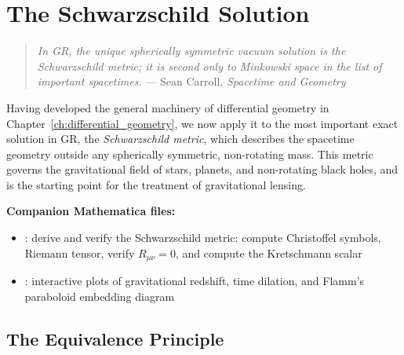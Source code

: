 
\chapter{The Schwarzschild Solution}
\label{ch:schwarzschild}

\begin{quote}
\textit{In GR, the unique spherically symmetric vacuum solution is the
Schwarzschild metric; it is second only to Minkowski space in the list of
important spacetimes.}
\hfill --- Sean Carroll, \textit{Spacetime and Geometry}
\end{quote}

\noindent
Having developed the general machinery of differential geometry in
Chapter~\ref{ch:differential_geometry}, we now apply it to the most important exact solution in GR,
the \emph{Schwarzschild metric}, which describes the spacetime geometry
outside any spherically symmetric, non-rotating mass.  This metric
governs the gravitational field of stars, planets, and non-rotating
black holes, and is the starting point for the treatment of gravitational
lensing.

\medskip
\noindent
\textbf{Companion Mathematica files:}
\begin{itemize}[nosep]
    \item {}:
          derive and verify the Schwarzschild metric: compute
          Christoffel symbols, Riemann tensor, verify $R_{\mu\nu} = 0$,
          and compute the Kretschmann scalar
    \item {}:
          interactive plots of gravitational redshift, time dilation,
          and Flamm's paraboloid embedding diagram
\end{itemize}

\section{The Equivalence Principle}
\label{sec:equivalence_principle}

